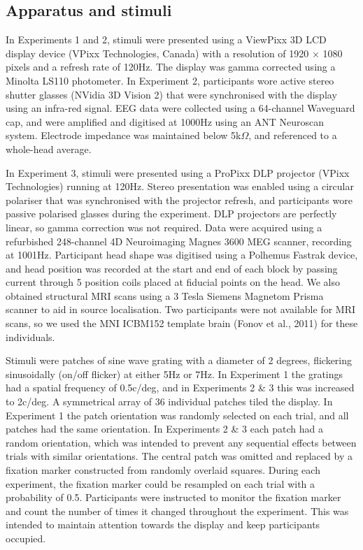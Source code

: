 \documentclass[
]{article}
\begin{document}
\hypertarget{apparatus-and-stimuli}{%
\subsection{Apparatus and stimuli}\label{apparatus-and-stimuli}}

In Experiments 1 and 2, stimuli were presented using a ViewPixx 3D LCD display device (VPixx Technologies, Canada) with a resolution of 1920 \(\times\) 1080 pixels and a refresh rate of 120Hz. The display was gamma corrected using a Minolta LS110 photometer. In Experiment 2, participants wore active stereo shutter glasses (NVidia 3D Vision 2) that were synchronised with the display using an infra-red signal. EEG data were collected using a 64-channel Waveguard cap, and were amplified and digitised at 1000Hz using an ANT Neuroscan system. Electrode impedance was maintained below 5k\(\Omega\), and referenced to a whole-head average.

In Experiment 3, stimuli were presented using a ProPixx DLP projector (VPixx Technologies) running at 120Hz. Stereo presentation was enabled using a circular polariser that was synchronised with the projector refresh, and participants wore passive polarised glasses during the experiment. DLP projectors are perfectly linear, so gamma correction was not required. Data were acquired using a refurbished 248-channel 4D Neuroimaging Magnes 3600 MEG scanner, recording at 1001Hz. Participant head shape was digitised using a Polhemus Fastrak device, and head position was recorded at the start and end of each block by passing current through 5 position coils placed at fiducial points on the head. We also obtained structural MRI scans using a 3 Tesla Siemens Magnetom Prisma scanner to aid in source localisation. Two participants were not available for MRI scans, so we used the MNI ICBM152 template brain (Fonov et al., 2011) for these individuals.

Stimuli were patches of sine wave grating with a diameter of 2 degrees, flickering sinusoidally (on/off flicker) at either 5Hz or 7Hz. In Experiment 1 the gratings had a spatial frequency of 0.5c/deg, and in Experiments 2 \& 3 this was increased to 2c/deg. A symmetrical array of 36 individual patches tiled the display. In Experiment 1 the patch orientation was randomly selected on each trial, and all patches had the same orientation. In Experiments 2 \& 3 each patch had a random orientation, which was intended to prevent any sequential effects between trials with similar orientations. The central patch was omitted and replaced by a fixation marker constructed from randomly overlaid squares. During each experiment, the fixation marker could be resampled on each trial with a probability of 0.5. Participants were instructed to monitor the fixation marker and count the number of times it changed throughout the experiment. This was intended to maintain attention towards the display and keep participants occupied.
\end{document}
